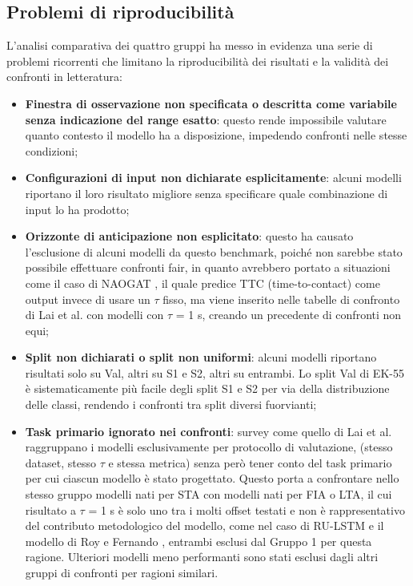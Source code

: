 \subsection{Problemi di riproducibilità}
L'analisi comparativa dei quattro gruppi ha messo in evidenza una serie di problemi ricorrenti che limitano la riproducibilità dei risultati e la validità dei confronti in letteratura:
\begin{itemize}
    \item \textbf{Finestra di osservazione non specificata o descritta come variabile senza indicazione del range esatto}: questo rende impossibile valutare quanto contesto il modello ha a disposizione, impedendo confronti nelle stesse condizioni;
    \item \textbf{Configurazioni di input non dichiarate esplicitamente}: alcuni modelli riportano il loro risultato migliore senza specificare quale combinazione di input lo ha prodotto;
    \item \textbf{Orizzonte di anticipazione non esplicitato}: questo ha causato l’esclusione di alcuni modelli da questo benchmark, poiché non sarebbe stato possibile effettuare confronti fair, in quanto avrebbero portato a situazioni come il caso di NAOGAT \cite{thakur2024leveraging}, il quale predice TTC (time-to-contact) come output invece di usare un $\tau$ fisso, ma viene inserito nelle tabelle di confronto di Lai et al. \cite{lai2024human} con modelli con $\tau$ = 1 s, creando un precedente di confronti non equi;
    \item \textbf{Split non dichiarati o split non uniformi}: alcuni modelli riportano risultati solo su Val, altri su S1 e S2, altri su entrambi. Lo split Val di EK-55 è sistematicamente più facile degli split S1 e S2 per via della distribuzione delle classi, rendendo i confronti tra split diversi fuorvianti;
    \item \textbf{Task primario ignorato nei confronti}: survey come quello di Lai et al. \cite{lai2024human} raggruppano i modelli esclusivamente per protocollo di valutazione, (stesso dataset, stesso $\tau$ e stessa metrica) senza però tener conto del task primario per cui ciascun modello è stato progettato. Questo porta a confrontare nello stesso gruppo modelli nati per STA con modelli nati per FIA o LTA, il cui risultato a $\tau$ = 1 s è solo uno tra i molti offset testati e non è rappresentativo del contributo metodologico del modello, come nel caso di RU-LSTM \cite{furnari2019would,furnari2020rolling} e il modello di Roy e Fernando \cite{roy2022action, roy2024predicting}, entrambi esclusi dal Gruppo 1 per questa ragione. Ulteriori modelli meno performanti sono stati esclusi dagli altri gruppi di confronti per ragioni similari.
\end{itemize}

